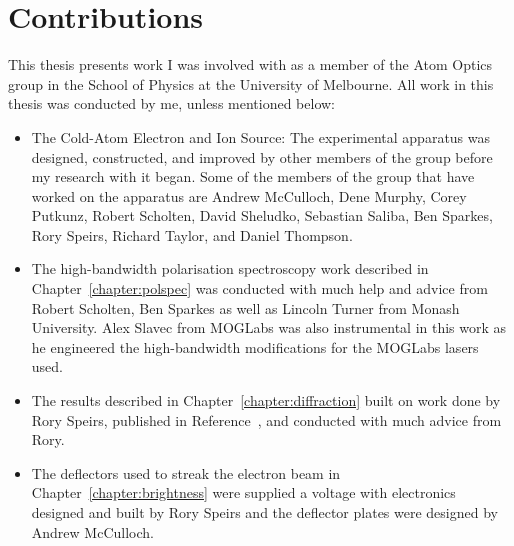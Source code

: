 \chapter*{Contributions}

This thesis presents work I was involved with as a member of the Atom Optics group in the School of Physics at the University of Melbourne.
All work in this thesis was conducted by me, unless mentioned below:
\begin{itemize}
\item The Cold-Atom Electron and Ion Source: The experimental apparatus was designed, constructed, and improved by other members of the group before my research with it began.
Some of the members of the group that have worked on the apparatus are
Andrew McCulloch, Dene Murphy, Corey Putkunz, Robert Scholten, David Sheludko, Sebastian Saliba, Ben Sparkes, Rory Speirs, Richard Taylor, and Daniel Thompson.
\item The high-bandwidth polarisation spectroscopy work described in Chapter~\ref{chapter:polspec} was conducted with much help and advice from Robert Scholten, Ben Sparkes as well as Lincoln Turner from Monash University. Alex Slavec from MOGLabs was also instrumental in this work as he engineered the high-bandwidth modifications for the MOGLabs lasers used.
\item The results described in Chapter~\ref{chapter:diffraction} built on work done by Rory Speirs, published in Reference~\cite{speirs_single-shot_2015}, and conducted with much advice from Rory.
\item The deflectors used to streak the electron beam in Chapter~\ref{chapter:brightness} were supplied a voltage with electronics designed and built by Rory Speirs and the deflector plates were designed by Andrew McCulloch.
\end{itemize}
